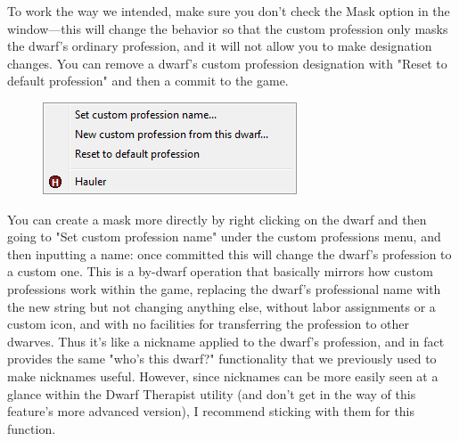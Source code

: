 \documentclass[]{article}
\begin{document}
To work the way we intended, make sure you don't check the Mask option in the window---this will change
the behavior so that the custom profession only masks the dwarf's ordinary profession, and it will not
allow you to make designation changes. You can remove a dwarf's custom profession designation with "Reset
to default profession" and then a commit to the game.

\begin{figure}
\vspace{-20pt}
  \begin{center}
    \includegraphics{Sec3Fig11}
  \end{center}
\vspace{-10pt}
\end{figure}
You can create a mask more directly by right clicking on the dwarf and then going to "Set custom
profession name" under the custom professions menu, and then inputting a name: once committed this will
change the dwarf's profession to a custom one. This is a by-dwarf operation that basically mirrors how
custom professions work within the game, replacing the dwarf's professional name with the new string but
not changing anything else, without labor assignments or a custom icon, and with no facilities for
transferring the profession to other dwarves. Thus it's like a nickname applied to the dwarf's
profession, and in fact provides the same "who's this dwarf?" functionality that we previously used to
make nicknames useful. However, since nicknames can be more easily seen at a glance within the Dwarf
Therapist utility (and don't get in the way of this feature's more advanced version), I recommend
sticking with them for this function.

\end{document}
